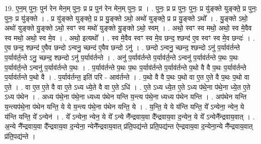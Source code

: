 \documentclass[17pt]{extarticle}
\begin{document}
19. ए॒न॒म् पुनः॒ पुन॑ रेन मेन॒म् पुनः॒ प्र प्र पुन॑ रेन मेन॒म् पुनः॒ प्र । . पुनः॒ प्र प्र पुनः॒ पुनः॒ प्र यु॑ङ्क्ते युङ्क्ते॒ प्र पुनः॒ पुनः॒ प्र यु॑ङ्क्ते । . प्र यु॑ङ्क्ते युङ्क्ते॒ प्र प्र यु॒ङ्क्ते ऽथो॒ अथो॑ युङ्क्ते॒ प्र प्र यु॒ङ्क्ते ऽथो᳚ । . यु॒ङ्क्ते ऽथो॒ अथो॑ युङ्क्ते यु॒ङ्क्ते ऽथो॒ स्वꣳ स्व मथो॑ युङ्क्ते यु॒ङ्क्ते ऽथो॒ स्वम् । . अथो॒ स्वꣳ स्व मथो॒ अथो॒ स्व मे॒वैव स्व मथो॒ अथो॒ स्व मे॒व । . अथो॒ इत्यथो᳚ । . स्व मे॒वैव स्वꣳ स्व मे॒व छन्द॒ श्छन्द॑ ए॒व स्वꣳ स्व मे॒व छन्दः॑ । . ए॒व छन्द॒ श्छन्द॑ ए॒वैव छन्दो ऽन्वनु॒ च्छन्द॑ ए॒वैव छन्दो ऽनु॑ । . छन्दो ऽन्वनु॒ च्छन्द॒ श्छन्दो ऽनु॑ प॒र्याव॑र्तन्ते प॒र्याव॑र्त॒न्ते ऽनु॒ च्छन्द॒ श्छन्दो ऽनु॑ प॒र्याव॑र्तन्ते । . अनु॑ प॒र्याव॑र्तन्ते प॒र्याव॑र्त॒न्ते ऽन्वनु॑ प॒र्याव॑र्तन्ते प॒थः प॒थः प॒र्याव॑र्त॒न्ते ऽन्वनु॑ प॒र्याव॑र्तन्ते प॒थः । . प॒र्याव॑र्तन्ते प॒थः प॒थः प॒र्याव॑र्तन्ते प॒र्याव॑र्तन्ते प॒थो वै वै प॒थः प॒र्याव॑र्तन्ते प॒र्याव॑र्तन्ते प॒थो वै । . प॒र्याव॑र्तन्त॒ इति॑ परि - आव॑र्तन्ते । . प॒थो वै वै प॒थः प॒थो वा ए॒त ए॒ते वै प॒थः प॒थो वा ए॒ते । . वा ए॒त ए॒ते वै वा ए॒ते ऽध्य ध्ये॒ते वै वा ए॒ते ऽधि॑ । . ए॒ते ऽध्य ध्ये॒त ए॒ते ऽध्य प॑थे॒ना प॑थे॒ना ध्ये॒त ए॒ते ऽध्य प॑थेन । . अध्य प॑थे॒ना प॑थे॒ना ध्यध्य प॑थेन यन्ति य॒न्त्य प॑थे॒ना ध्यध्य प॑थेन यन्ति । . अप॑थेन यन्ति य॒न्त्यप॑थे॒ना प॑थेन यन्ति॒ ये ये य॒न्त्य प॑थे॒ना प॑थेन यन्ति॒ ये । . य॒न्ति॒ ये ये य॑न्ति यन्ति॒ ये᳚ ऽन्येना॒ न्येन॒ ये य॑न्ति यन्ति॒ ये᳚ ऽन्येन॑ । . ये᳚ ऽन्येना॒ न्येन॒ ये ये᳚ ऽन्ये नै᳚न्द्रवाय॒वा दै᳚न्द्रवाय॒वा द॒न्येन॒ ये ये᳚ ऽन्येनै᳚न्द्रवाय॒वात् । . अ॒न्ये नै᳚न्द्रवाय॒वा दै᳚न्द्रवाय॒वा द॒न्येना॒ न्येनै᳚न्द्रवाय॒वात् प्र॑ति॒पद्य॑न्ते प्रति॒पद्य॑न्त ऐन्द्रवाय॒वा द॒न्येना॒न्ये नै᳚न्द्रवाय॒वात् प्र॑ति॒पद्य॑न्ते । \newline
\end{document}

